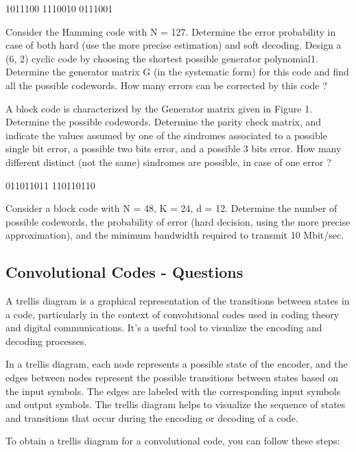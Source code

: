 \documentclass[colorlinks,11pt,a4paper,normalphoto,withhyper,ragged2e]{altareport}
\begin{document}
				1011100
				1110010
				0111001
				
				Consider the Hamming code with N = 127. Determine the error probability in case of both hard (use the more precise estimation) and soft decoding. Design a (6, 2) cyclic code by choosing the shortest possible generator polynomial1. Determine the generator matrix G (in the systematic form) for this code and find all the possible codewords. How many errors can be corrected by this code ?
		
				
				
				
				
				
				A block code is characterized by the Generator matrix given in Figure 1. Determine the possible codewords. Determine the parity check matrix, and indicate the values assumed by one of the sindromes associated to a possible single bit error, a possible two bits error, and a possible 3 bits error. How many different distinct (not the same) sindromes are possible, in case of one error ?
				
				011011011
				110110110
				
				
				Consider a block code with N = 48, K = 24, d = 12. Determine the number of possible codewords, the probability of error (hard decision, using the more precise approximation), and the minimum bandwidth required to transmit 10 Mbit/sec.
				
				
				
				
		
		
		\subsection{Convolutional Codes - Questions}
			
			
			A trellis diagram is a graphical representation of the transitions between states in a code, particularly in the context of convolutional codes used in coding theory and digital communications. It's a useful tool to visualize the encoding and decoding processes.
			
			In a trellis diagram, each node represents a possible state of the encoder, and the edges between nodes represent the possible transitions between states based on the input symbols. The edges are labeled with the corresponding input symbols and output symbols. The trellis diagram helps to visualize the sequence of states and transitions that occur during the encoding or decoding of a code.
			
			To obtain a trellis diagram for a convolutional code, you can follow these steps:
			
\end{document}
